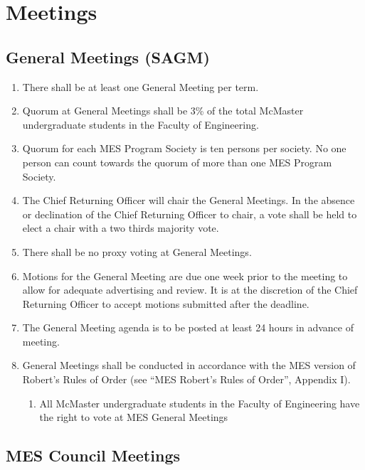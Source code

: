 \section{Meetings}
\label{meetings}

\subsection{General Meetings (SAGM)}
\label{general-meetings-sagm}
\begin{enumerate}
 \item
  There shall be at least one General Meeting per term.
 \item
  Quorum at General Meetings shall be 3\% of the total McMaster undergraduate students in the Faculty of Engineering.
 \item
  Quorum for each MES Program Society is ten persons per society. No one person can count towards the quorum of more than one MES Program Society.
 \item
  The Chief Returning Officer will chair the General Meetings. In the absence or declination of the Chief Returning Officer to chair, a vote shall be held to elect a chair with a two thirds majority vote.
 \item
  There shall be no proxy voting at General Meetings.
 \item
  Motions for the General Meeting are due one week prior to the meeting to allow for adequate advertising and review. It is at the discretion of the Chief Returning Officer to accept motions submitted after the deadline.
 \item
  The General Meeting agenda is to be posted at least 24 hours in advance of meeting.
 \item
  General Meetings shall be conducted in accordance with the MES version of Robert's Rules of Order (see ``MES Robert's Rules of Order'', Appendix I).

  \begin{enumerate}
   \item
    All McMaster undergraduate students in the Faculty of Engineering have the right to vote at MES General Meetings
  \end{enumerate}
\end{enumerate}

\subsection{MES Council Meetings}
\label{mes-council-meetings}

